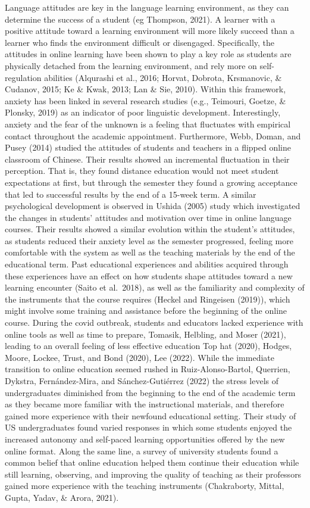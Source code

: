 \documentclass[
  man]{apa6}
\begin{document}
Language attitudes are key in the language learning environment, as they can determine the success of a student (eg Thompson, 2021). A learner with a positive attitude toward a learning environment will more likely succeed than a learner who finds the environment difficult or disengaged. Specifically, the attitudes in online learning have been shown to play a key role as students are physically detached from the learning environment, and rely more on self-regulation abilities (Alqurashi et al., 2016; Horvat, Dobrota, Krsmanovic, \& Cudanov, 2015; Ke \& Kwak, 2013; Lan \& Sie, 2010). Within this framework, anxiety has been linked in several research studies (e.g., Teimouri, Goetze, \& Plonsky, 2019) as an indicator of poor linguistic development. Interestingly, anxiety and the fear of the unknown is a feeling that fluctuates with empirical contact throughout the academic appointment. Furthermore, Webb, Doman, and Pusey (2014) studied the attitudes of students and teachers in a flipped online classroom of Chinese. Their results showed an incremental fluctuation in their perception. That is, they found distance education would not meet student expectations at first, but through the semester they found a growing acceptance that led to successful results by the end of a 15-week term. A similar psychological development is observed in Ushida (2005) study which investigated the changes in students' attitudes and motivation over time in online language courses. Their results showed a similar evolution within the student's attitudes, as students reduced their anxiety level as the semester progressed, feeling more comfortable with the system as well as the teaching materials by the end of the educational term.
Past educational experiences and abilities acquired through these experiences have an effect on how students shape attitudes toward a new learning encounter (Saito et al.~2018), as well as the familiarity and complexity of the instruments that the course requires (Heckel and Ringeisen (2019)), which might involve some training and assistance before the beginning of the online course. During the covid outbreak, students and educators lacked experience with online tools as well as time to prepare, Tomasik, Helbling, and Moser (2021), leading to an overall feeling of less effective education Top hat (2020), Hodges, Moore, Lockee, Trust, and Bond (2020), Lee (2022). While the immediate transition to online education seemed rushed in Ruiz-Alonso-Bartol, Querrien, Dykstra, Fernández-Mira, and Sánchez-Gutiérrez (2022) the stress levels of undergraduates diminished from the beginning to the end of the academic term as they became more familiar with the instructional materials, and therefore gained more experience with their newfound educational setting. Their study of US undergraduates found varied responses in which some students enjoyed the increased autonomy and self-paced learning opportunities offered by the new online format. Along the same line, a survey of university students found a common belief that online education helped them continue their education while still learning, observing, and improving the quality of teaching as their professors gained more experience with the teaching instruments (Chakraborty, Mittal, Gupta, Yadav, \& Arora, 2021).
\end{document}
